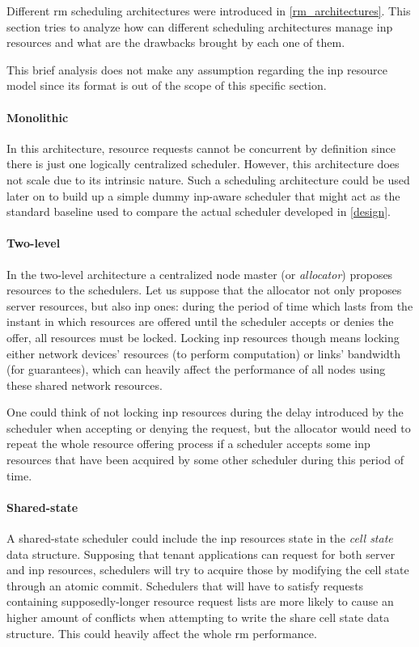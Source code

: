 Different \gls{rm} scheduling architectures were introduced in \autoref{rm_architectures}.
This section tries to analyze how can different scheduling architectures manage \gls{inp} resources and what are the drawbacks brought by each one of them.\par
This brief analysis does not make any assumption regarding the \gls{inp} resource model since its format is out of the scope of this specific section.

\paragraph{Monolithic}
In this architecture, resource requests cannot be concurrent by definition since there is just one logically centralized scheduler.
However, this architecture does not scale due to its intrinsic nature.
Such a scheduling architecture could be used later on to build up a simple dummy \gls{inp}-aware scheduler that might act as the standard baseline used to compare the actual scheduler developed in \autoref{design}.

\paragraph{Two-level}
In the two-level architecture a centralized node master (or \textit{allocator}) proposes resources to the schedulers.
Let us suppose that the allocator not only proposes server resources, but also \gls{inp} ones: during the period of time which lasts from the instant in which resources are offered until the scheduler accepts or denies the offer, all resources must be locked.
Locking \gls{inp} resources though means locking either network devices' resources (to perform computation) or links' bandwidth (for guarantees), which can heavily affect the performance of all nodes using these shared network resources.\par
One could think of not locking \gls{inp} resources during the delay introduced by the scheduler when accepting or denying the request, but the allocator would need to repeat the whole resource offering process if a scheduler accepts some \gls{inp} resources that have been acquired by some other scheduler during this period of time.

\paragraph{Shared-state}
A shared-state scheduler could include the \gls{inp} resources state in the \textit{cell state} data structure.
Supposing that tenant applications can request for both server and \gls{inp} resources, schedulers will try to acquire those by modifying the cell state through an atomic commit.
Schedulers that will have to satisfy requests containing supposedly-longer resource request lists are more likely to cause an higher amount of conflicts when attempting to write the share cell state data structure.
This could heavily affect the whole \gls{rm} performance.